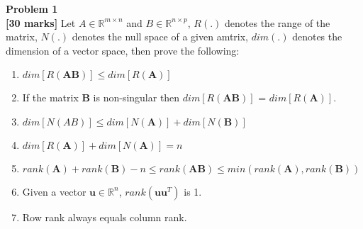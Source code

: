 \documentclass[fleqn]{article}
\newenvironment{problem}[2][Problem]
    { \begin{mdframed}[backgroundcolor=gray!20] \textbf{#1 #2} \\}
    {  \end{mdframed}}
\begin{document}
\begin{problem}{1}
\textbf{[30 marks]} Let $A \in \mathbb{R}^{m \times n}$ and $B \in \mathbb{R}^{n \times p}$, $R(.)$ denotes the range of the matrix, $N(.)$ denotes the null space of a given amtrix, $dim(.)$ denotes the dimension of a vector space, then prove the following:\\
\begin{enumerate}[label=(\alph*)]
\item $dim[R(\textbf{AB})] \leq dim[R(\textbf{A})]$
\item If the matrix $\textbf{B}$ is non-singular then $dim[R(\textbf{AB})]$ = $dim[R(\textbf{A})]$.
\item $dim[N(AB)] \leq dim[N(\textbf{A})] + dim[N(\textbf{B})]$
\item $dim[R(\textbf{A})] + dim[N(\textbf{A})]= n$
\item $rank(\textbf{A}) + rank(\textbf{B}) - n \leq rank(\textbf{AB}) \leq min(rank(\textbf{A}), rank(\textbf{B}))$
\item Given a vector $\textbf{u} \in \mathbb{R}^n$, $rank(\textbf{u}\textbf{u}^T)$ is 1.
\item Row rank always equals column rank.
\end{enumerate}
\end{problem}
\end{document}
